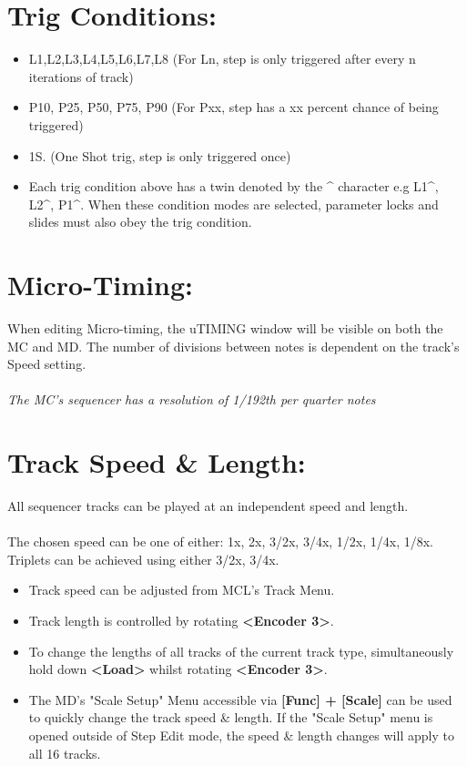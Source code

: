 \section{Trig Conditions:}
\begin{itemize}
\item L1,L2,L3,L4,L5,L6,L7,L8 (For Ln, step is only triggered after every n iterations of track)
\item P10, P25, P50, P75, P90 (For Pxx, step has a xx percent chance of being triggered)
\item 1S. (One Shot trig, step is only triggered once)
\item Each trig condition above has a twin denoted by the \^{} character e.g L1\^{}, L2\^{}, P1\^{}. When these condition modes are selected, parameter locks and slides must also obey the trig condition.
\end{itemize}
\section{Micro-Timing:}
When editing Micro-timing, the uTIMING window will be visible on both the MC and MD. The number of divisions between notes is dependent on the track's Speed setting.\\\\\textit{The MC's sequencer has a resolution of 1/192th per quarter notes}\\
\section{Track Speed \& Length:}
All sequencer tracks can be played at an independent speed and length.\\\\
The chosen speed can be one of either: 1x, 2x, 3/2x, 3/4x, 1/2x, 1/4x, 1/8x.\\Triplets can be achieved using either 3/2x, 3/4x.
\begin{itemize}
\item Track speed can be adjusted from MCL's Track Menu.
\item Track length is controlled by rotating \textbf{<Encoder 3>}.
\item To change the lengths of all tracks of the current track type, simultaneously hold down \textbf{<Load>} whilst rotating \textbf{<Encoder 3>}.
\item The MD's "Scale Setup" Menu accessible via \textbf{[Func] + [Scale]} can be used to quickly change the track speed \& length. If the "Scale Setup" menu is opened outside of Step Edit mode, the speed \& length changes will apply to all 16 tracks.
\end{itemize}
\newpage
